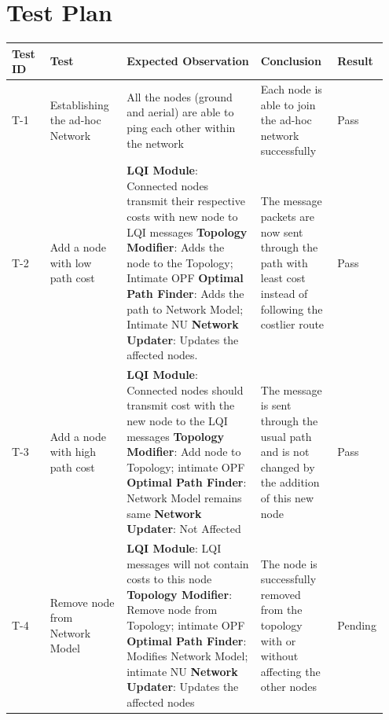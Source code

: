 \documentclass{article}
\begin{document}
\section{Test Plan}
{\renewcommand{\arraystretch}{1.5}
\begin{longtable}{  | p{0.1\linewidth} | p{0.2\linewidth} | p{0.35\linewidth} | p{0.2\linewidth} | p{0.1\linewidth} | }
\hline
\textbf{Test ID} & \textbf{Test} & \textbf{Expected Observation} & \textbf{Conclusion} & \textbf{Result} \\ 
\hline \hline
T-1 & Establishing the ad-hoc Network & All the nodes (ground and aerial) are able to ping each other within the network
& Each node is able to join the ad-hoc network successfully & Pass \\
\hline
T-2 & 
Add a node with low path cost & 
\textbf{LQI Module}: Connected nodes transmit their respective costs with new node to LQI messages \newline 
\textbf{Topology Modifier}: Adds the node to the Topology; Intimate OPF \newline 
\textbf{Optimal Path Finder}: Adds the path to Network Model; Intimate NU \newline
\textbf{Network Updater}: Updates the affected nodes. &
The message packets are now sent through the path with least cost instead of following the costlier route &
Pass \\
\hline
T-3 & 
Add a node with high path cost & 
\textbf{LQI Module}: Connected nodes should transmit cost with the new node to the LQI messages\newline 
\textbf{Topology Modifier}: Add node to Topology; intimate OPF\newline 
\textbf{Optimal Path Finder}: Network Model remains same\newline
\textbf{Network Updater}: Not Affected &
The message is sent through the usual path and is not changed by the addition of this new node &
Pass\\
\hline
T-4 & 
Remove node from Network Model & 
\textbf{LQI Module}: LQI messages will not contain costs to this node\newline 
\textbf{Topology Modifier}: Remove node from Topology; intimate OPF \newline 
\textbf{Optimal Path Finder}: Modifies Network Model; intimate NU \newline
\textbf{Network Updater}: Updates the affected nodes &
The node is successfully removed from the topology with or without affecting the other nodes &
Pending\\

\end{longtable}}
\end{document}

